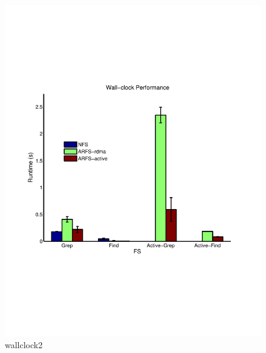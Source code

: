 \documentclass[10pt]{article}
\begin{document}
\begin{figure}
  \centering
\includegraphics[scale=0.5, trim = 0 200 0 200]{../../results/matlab/wallclock2.pdf}
  \caption{wallclock2}\label{wallclock2}
\end{figure}
\end{document}
